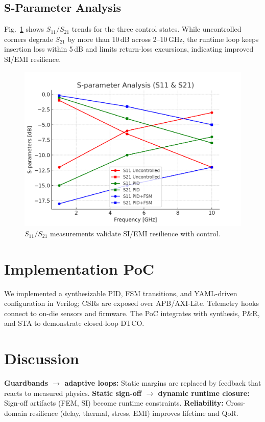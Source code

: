 \documentclass[conference]{IEEEtran}
\begin{document}
\subsection{S-Parameter Analysis}
Fig.~\ref{fig:sparam} shows $S_{11}/S_{21}$ trends for the three control states. While uncontrolled corners degrade $S_{21}$ by more than 10\,dB across 2--10\,GHz, the runtime loop keeps insertion loss within 5\,dB and limits return-loss excursions, indicating improved SI/EMI resilience.

\begin{figure}[t]
\centering
\includegraphics[width=0.95\linewidth]{figs/sparam_s11s21.png}
\caption{$S_{11}/S_{21}$ measurements validate SI/EMI resilience with control.}
\label{fig:sparam}
\end{figure}

\section{Implementation PoC}
We implemented a synthesizable PID, FSM transitions, and YAML-driven configuration in Verilog; CSRs are exposed over APB/AXI-Lite. Telemetry hooks connect to on-die sensors and firmware. The PoC integrates with synthesis, P\&R, and STA to demonstrate closed-loop DTCO.

\section{Discussion}
\textbf{Guardbands $\rightarrow$ adaptive loops:} Static margins are replaced by feedback that reacts to measured physics.  
\textbf{Static sign-off $\rightarrow$ dynamic runtime closure:} Sign-off artifacts (FEM, SI) become runtime constraints.  
\textbf{Reliability:} Cross-domain resilience (delay, thermal, stress, EMI) improves lifetime and QoR.
\end{document}

